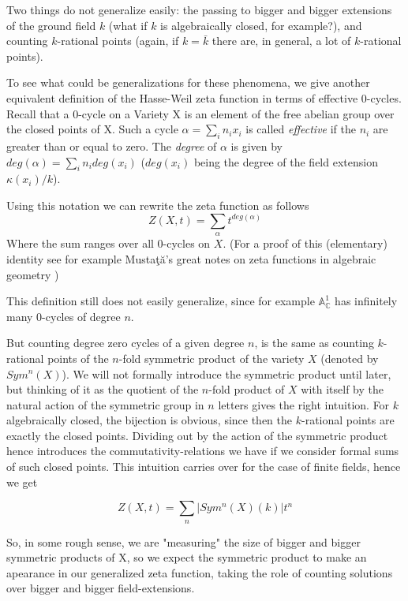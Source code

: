 \documentclass[11pt, a4paper, german]{article}
\theoremstyle{plain}
\theoremstyle{definition}
\begin{document}
Two things do not generalize easily: the passing to bigger and bigger extensions of the ground field $k$ (what if $k$ is algebraically closed,
for example?), and counting $k$-rational points (again, if $k = \bar{k}$ there are, in general, a lot of $k$-rational points). 

To see what could be generalizations for these phenomena, 
we give another equivalent definition of the Hasse-Weil zeta function in terms of effective 0-cycles. 
Recall that a 0-cycle on a Variety X is an element of the free abelian group over the closed 
points of X. Such a cycle $\alpha = \sum_i n_i x_i$ is called \emph{effective} if the $n_i$ are greater than or equal to zero.
The \emph{degree} of $\alpha$ is given by $deg(\alpha) = \sum_i n_i deg(x_i)$ ($deg(x_i)$ being the degree of the field extension $\kappa(x_i)/k$).

Using this notation we can rewrite the zeta function as follows 
\begin{equation}
    Z(X,t) = \sum_{\alpha} t^{deg(\alpha)}
\end{equation}
Where the sum ranges over all 0-cycles on $X$.
(For a proof of this (elementary) identity see for example Musta\c{t}\u{a}'s great notes on zeta functions in algebraic geometry 
\cite[Remark 2.9]{mustata})

This definition still does not easily generalize, since for example $\mathbb{A}_{\mathbb{C}}^1$ has infinitely many 0-cycles of degree $n$.

But counting degree zero cycles of a given degree $n$, is the same as counting $k$-rational points of the $n$-fold symmetric product of the 
variety $X$ (denoted by $Sym^n(X)$).
We will not formally introduce the symmetric product until later, but thinking of it as the quotient of 
the $n$-fold product of $X$ with itself by the natural action of the symmetric group in $n$ letters gives the right intuition. 
For $k$ algebraically closed, the bijection is obvious, since then the $k$-rational points are exactly the closed points. 
Dividing out by the action of the symmetric product hence introduces the commutativity-relations we have if we consider formal sums
of such closed points. This intuition carries over for the case of finite fields, hence we get

\begin{equation}
    Z(X,t) = \sum_{n} |Sym^n(X)(k)| t^n
\end{equation}

So, in some rough sense, we are "measuring" the size of bigger and bigger symmetric products of X, so we expect the symmetric product
to make an apearance in our generalized zeta function, taking the role of counting solutions over bigger and bigger field-extensions.
\end{document}

